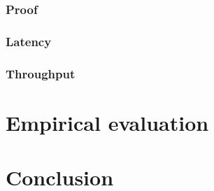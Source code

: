 \documentclass[a4paper]{article}
\begin{document}
        \subsubsection{Proof}
        \label{sec:pipelineack-proof}
        \subsubsection{Latency}

        \subsubsection{Throughput}

        \section{Empirical evaluation}

        \section*{Conclusion}

        
\end{document}
